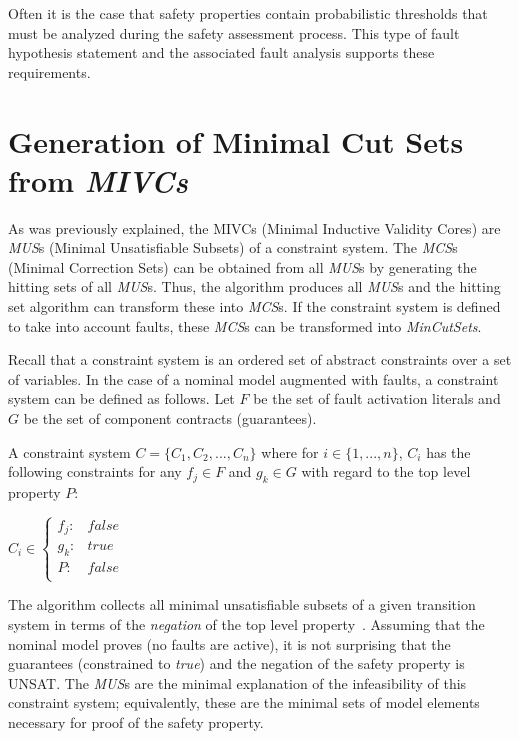 Often it is the case that safety properties contain probabilistic thresholds that must be analyzed during the safety assessment process. This type of fault hypothesis statement and the associated fault analysis supports these requirements.

\section{Generation of Minimal Cut Sets from \textit{MIVCs}}
As was previously explained, the MIVCs (Minimal Inductive Validity Cores) are \textit{MUS}s (Minimal Unsatisfiable Subsets) of a constraint system. The \textit{MCS}s (Minimal Correction Sets) can be obtained from all \textit{MUS}s by generating the hitting sets of all \textit{MUS}s. Thus, the \aivcalg algorithm produces all \textit{MUS}s and the hitting set algorithm can transform these into \textit{MCS}s. If the constraint system is defined to take into account faults, these \textit{MCS}s can be transformed into \textit{MinCutSets}. 

Recall that a constraint system is an ordered set of abstract constraints over a set of variables. In the case of a nominal model augmented with faults, a constraint system can be defined as follows. Let $F$ be the set of fault activation literals and $G$ be the set of component contracts (guarantees). 

\begin{definition}A constraint system $C = \{C_1,C_2,...,C_n\}$ where for $i \in \{1,...,n\}$, $C_i$ has the following constraints for any $f_j \in F$ and $g_k \in G$ with regard to the top level property $P$: 
\begin{center}
$C_i \in \left\{ \begin{array}{ll}
	f_j :&  false\\
	g_k :& true\\
	P :& false\\
\end{array}\right.$	
\end{center}
\label{def:constraintsystem}
\end{definition}

The \aivcalg algorithm collects all minimal unsatisfiable subsets of a given transition system in terms of the \textit{negation} of the top level property~\cite{Ghassabani2017EfficientGO,bendik2018online}. Assuming that the nominal model proves (no faults are active), it is not surprising that the guarantees (constrained to \textit{true}) and the negation of the safety property is UNSAT. The \textit{MUS}s are the minimal explanation of the infeasibility of this constraint system; equivalently, these are the minimal sets of model elements necessary for proof of the safety property.


